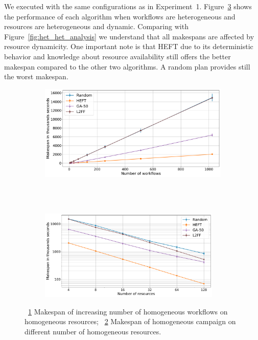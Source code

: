 We executed with the same configurations as in Experiment~1. 
Figure~\ref{fig:dyn_hetero_analysis} shows the performance of each algorithm when workflows are heterogeneous and resources are heterogeneous and dynamic.
Comparing with Figure~\ref{fig:het_het_analysis} we understand that all makespans are affected by resource dynamicity.
One important note is that HEFT due to its deterministic behavior and knowledge about resource availability still offers the better makespan compared to the other two algorithms.
A random plan provides still the worst makespan.

\begin{figure}[ht!]
    \centering
    \begin{subfigure}[b]{0.85\textwidth}
        \includegraphics[width=.95\textwidth]{figures/campaign/StHeteroCampaigns_4DynHeteroResources.pdf}
        \caption{}
        \label{fig:StHeteroCampaigns_4DyHeteroResources}
    \end{subfigure}\\
    ~ 
    \begin{subfigure}[b]{0.85\textwidth}
        \includegraphics[width=0.95\textwidth]{figures/campaign/DynHeteroResources_StHeteroCampaigns.pdf}
        \caption{}
        \label{fig:DyHeteroResources_StHeteroCampaigns}
    \end{subfigure}
    \caption{~\ref{fig:StHeteroCampaigns_4DyHeteroResources} Makespan of increasing number of homogeneous workflows on homogeneous resources;
        ~\ref{fig:DyHeteroResources_StHeteroCampaigns} Makespan of homogeneous campaign on different number of homogeneous resources.}
    \label{fig:dyn_hetero_analysis}
\end{figure}

